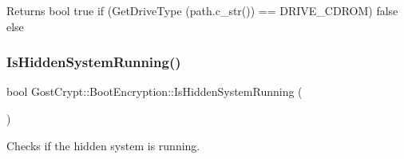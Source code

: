 \begin{DoxyReturn}{Returns}
bool true if (Get\+Drive\+Type (path.\+c\+\_\+str()) == D\+R\+I\+V\+E\+\_\+\+C\+D\+R\+OM) false else 
\end{DoxyReturn}
\mbox{\label{class_gost_crypt_1_1_boot_encryption_a41ca434ce3526f63bc083f7dab6a1532}} 
\subsubsection{\texorpdfstring{Is\+Hidden\+System\+Running()}{IsHiddenSystemRunning()}}
{\footnotesize\ttfamily bool Gost\+Crypt\+::\+Boot\+Encryption\+::\+Is\+Hidden\+System\+Running (\begin{DoxyParamCaption}{ }\end{DoxyParamCaption})}



Checks if the hidden system is running. 

